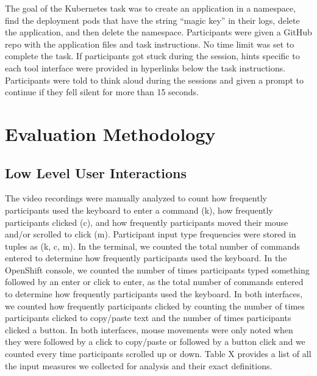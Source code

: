 \documentclass[11pt, oneside]{article}   	%
\begin{document}

The goal of the Kubernetes task was to create an application in a namespace, find the deployment pods that have the string “magic key” in their logs, delete the application, and then delete the namespace. Participants were given a GitHub repo with the application files and task instructions. No time limit was set to complete the task. If participants got stuck during the session, hints specific to each tool interface were provided in hyperlinks below the task instructions. Participants were told to think aloud during the sessions and given a prompt to continue if they fell silent for more than 15 seconds.

\section{Evaluation Methodology}
\subsection{Low Level User Interactions}
The video recordings were manually analyzed to count how frequently participants used the keyboard to enter a command (k), how frequently participants clicked (c), and how frequently participants moved their mouse and/or scrolled to click (m). Participant input type frequencies were stored in tuples as (k, c, m). In the terminal, we counted the total number of commands entered to determine how frequently participants used the keyboard. In the OpenShift console, we counted the number of times participants typed something followed by an enter or click to enter, as the total number of commands entered to determine how frequently participants used the keyboard. In both interfaces, we counted how frequently participants clicked by counting the number of times participants clicked to copy/paste text and the number of times participants clicked a button. In both interfaces, mouse movements were only noted when they were followed by a click to copy/paste or followed by a button click and we counted every time participants scrolled up or down. Table X provides a list of all the input measures we collected for analysis and their exact definitions.
\end{document}
